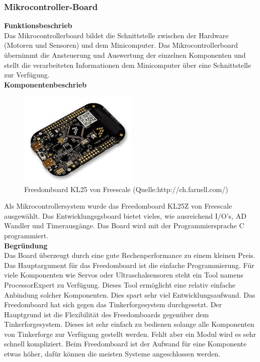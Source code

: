 \subsubsection{Mikrocontroller-Board}
\textbf{Funktionsbeschrieb}\\[0.2cm]
Das Mikrocontrollerboard bildet die Schnittstelle zwischen der Hardware (Motoren und Sensoren) und dem Minicomputer. Das Mikrocontrollerboard übernimmt die Ansteuerung und Auswertung der einzelnen Komponenten und stellt die verarbeiteten Informationen dem Minicomputer über eine Schnittstelle zur Verfügung.\\[0.2cm]
\newpage
\textbf{Komponentenbeschrieb}
\begin{figure}[H]
	\centering
	\includegraphics[width=0.5\textwidth]{03_Loesungskonzept/pictures/freedomboard.png}
	\caption{Freedomboard KL25 von Freescale (Quelle:http://ch.farnell.com/)}
\end{figure}
Als Mikrocontrollersystem wurde das Freedomboard KL25Z von Freescale ausgewählt. Das Entwicklungsgsboard bietet vieles, wie ausreichend I/O's, AD Wandler und Timerausgänge. Das Board wird mit der Programmiersprache C programmiert.\\[0.2cm]
\textbf{Begründung}\\[0.2cm]
Das Board überzeugt durch eine gute Rechenperformance zu einem kleinen Preis. Das Hauptargument für das Freedomboard ist die einfache Programmierung. Für viele Komponenten wie Servos oder Ultraschalsensoren steht ein Tool namens ProcessorExpert zu Verfügung. Dieses Tool ermöglicht eine relativ einfache Anbindung solcher Komponenten. Dies spart sehr viel Entwicklungsaufwand.
Das Freedomboard hat sich gegen das Tinkerforgesystem durchgesetzt. Der Hauptgrund ist die Flexibilität des Freedomboards gegenüber dem Tinkerforgesystem. Dieses ist sehr einfach zu bedienen solange alle Komponenten von Tinkerforge zur Verfügung gestellt werden. Fehlt aber ein Modul wird es sehr schnell kompliziert. Beim Freedomboard ist der Aufwand für eine Komponente etwas höher, dafür können die meisten Systeme angeschlossen werden.\\[0.2cm]
